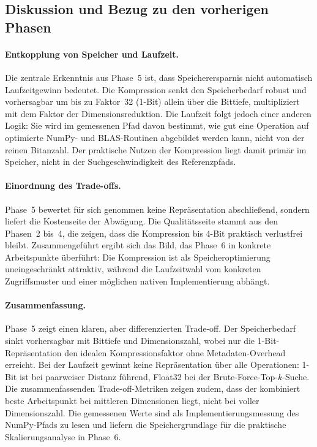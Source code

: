 \subsection{Diskussion und Bezug zu den vorherigen Phasen}
%
\paragraph{Entkopplung von Speicher und Laufzeit.}
Die zentrale Erkenntnis aus Phase~5 ist, dass Speicherersparnis nicht automatisch Laufzeitgewinn bedeutet.
Die Kompression senkt den Speicherbedarf robust und vorhersagbar um bis zu Faktor~32 (1-Bit) allein über die Bittiefe, multipliziert mit dem Faktor der Dimensionsreduktion.
Die Laufzeit folgt jedoch einer anderen Logik: Sie wird im gemessenen Pfad davon bestimmt, wie gut eine Operation auf optimierte NumPy- und BLAS-Routinen abgebildet werden kann, nicht von der reinen Bitanzahl.
Der praktische Nutzen der Kompression liegt damit primär im Speicher, nicht in der Suchgeschwindigkeit des Referenzpfads.
%
\paragraph{Einordnung des Trade-offs.}
Phase~5 bewertet für sich genommen keine Repräsentation abschließend, sondern liefert die Kostenseite der Abwägung.
Die Qualitätsseite stammt aus den Phasen~2 bis~4, die zeigen, dass die Kompression bis 4-Bit praktisch verlustfrei bleibt.
Zusammengeführt ergibt sich das Bild, das Phase~6 in konkrete Arbeitspunkte überführt: Die Kompression ist als Speicheroptimierung uneingeschränkt attraktiv, während die Laufzeitwahl vom konkreten Zugriffsmuster und einer möglichen nativen Implementierung abhängt.
%
\paragraph{Zusammenfassung.}
Phase~5 zeigt einen klaren, aber differenzierten Trade-off.
Der Speicherbedarf sinkt vorhersagbar mit Bittiefe und Dimensionszahl, wobei nur die 1-Bit-Repräsentation den idealen Kompressionsfaktor ohne Metadaten-Overhead erreicht.
Bei der Laufzeit gewinnt keine Repräsentation über alle Operationen: 1-Bit ist bei paarweiser Distanz führend, Float32 bei der Brute-Force-Top-$k$-Suche.
Die zusammenfassenden Trade-off-Metriken zeigen zudem, dass der kombiniert beste Arbeitspunkt bei mittleren Dimensionen liegt, nicht bei voller Dimensionszahl.
Die gemessenen Werte sind als Implementierungsmessung des NumPy-Pfads zu lesen und liefern die Speichergrundlage für die praktische Skalierungsanalyse in Phase~6.
%
